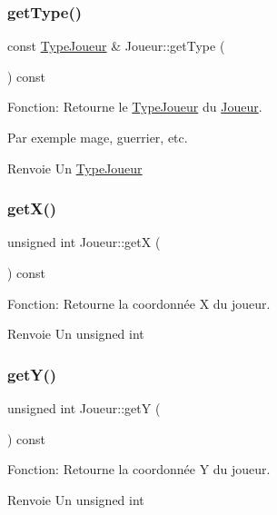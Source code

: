 \subsubsection{\texorpdfstring{get\+Type()}{getType()}}
{\footnotesize\ttfamily const \mbox{\hyperlink{structTypeJoueur}{Type\+Joueur}} \& Joueur\+::get\+Type (\begin{DoxyParamCaption}{ }\end{DoxyParamCaption}) const}



Fonction\+: Retourne le \mbox{\hyperlink{structTypeJoueur}{Type\+Joueur}} du \mbox{\hyperlink{classJoueur}{Joueur}}. 

Par exemple mage, guerrier, etc. \begin{DoxyReturn}{Renvoie}
Un \mbox{\hyperlink{structTypeJoueur}{Type\+Joueur}} 
\end{DoxyReturn}
\mbox{\label{classJoueur_a0d86f3ee629b3061192a4ac6631bc608}} 
\subsubsection{\texorpdfstring{get\+X()}{getX()}}
{\footnotesize\ttfamily unsigned int Joueur\+::getX (\begin{DoxyParamCaption}{ }\end{DoxyParamCaption}) const}



Fonction\+: Retourne la coordonnée X du joueur. 

\begin{DoxyReturn}{Renvoie}
Un unsigned int 
\end{DoxyReturn}
\mbox{\label{classJoueur_aa9c3a397e0ca29e7137effdbd693334d}} 
\subsubsection{\texorpdfstring{get\+Y()}{getY()}}
{\footnotesize\ttfamily unsigned int Joueur\+::getY (\begin{DoxyParamCaption}{ }\end{DoxyParamCaption}) const}



Fonction\+: Retourne la coordonnée Y du joueur. 

\begin{DoxyReturn}{Renvoie}
Un unsigned int 
\end{DoxyReturn}
\mbox{\label{classJoueur_ac1ed6a6c64897d04401117fe9ed4a3a3}} 
